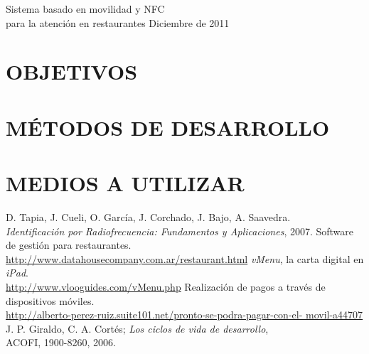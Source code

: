 \documentclass[11pt,a4paper,spanish,twoside]{book}
\begin{document}
\encabezado

{Sistema basado en movilidad y NFC \\para la atención en restaurantes}
{Diciembre de 2011}

\tableofcontents

\chapter{OBJETIVOS}


\chapter{MÉTODOS DE DESARROLLO}


\chapter{MEDIOS A UTILIZAR}


\begin{thebibliography}{99}
 D. Tapia, J. Cueli, O. García, J. Corchado, J. Bajo, A. 
Saavedra. \\
\emph{Identificación por Radiofrecuencia: Fundamentos y Aplicaciones}, 2007.
 Software de gestión para restaurantes. \\
    \url{http://www.datahousecompany.com.ar/restaurant.html}
 \emph{vMenu}, la carta digital en \emph{iPad}. \\
    \url{http://www.vlooguides.com/vMenu.php}
 Realización de pagos a través de dispositivos móviles. \\
    \url{http://alberto-perez-ruiz.suite101.net/pronto-se-podra-pagar-con-el-
movil-a44707} 
 J. P. Giraldo, C. A. Cortés; \emph{Los ciclos de vida de
desarrollo},\\ ACOFI, 1900-8260, 2006.
\end{thebibliography}
\end{document}
